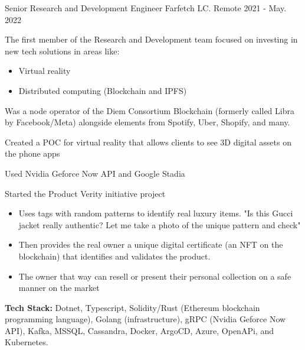\begin{cventries}
\cventry
  {Senior Research and Development Engineer} %
  {Farfetch LC.} %
  {Remote} %
  {2021 - May. 2022} %
  {
    \begin{cvitems} %
      \item {The first member of the Research and Development team focused on investing in new tech solutions in areas like:}
      \begin{itemize}
       \item Virtual reality
       \item Distributed computing (Blockchain and IPFS)
      \end{itemize}
      \item {Was a node operator of the Diem Consortium Blockchain (formerly called Libra by Facebook/Meta) alongside elements from Spotify, Uber, Shopify, and many.}
      \item {Created a POC for virtual reality that allows clients to see 3D digital assets on the phone apps}
      \item {Used Nvidia Geforce Now API and Google Stadia}
      \item {Started the Product Verity initiative project}
      \begin{itemize}
       \item Uses tags with random patterns to identify real luxury items. "Is this Gucci jacket really authentic? Let me take a photo of the unique pattern and check"
       \item Then provides the real owner a unique digital certificate (an NFT on the blockchain) that identifies and validates the product.
       \item The owner that way can resell or present their personal collection on a safe manner on the market
      \end{itemize}
      \item {\textbf{Tech Stack:} Dotnet, Typescript, Solidity/Rust (Ethereum blockchain programming language), Golang (infrastructure), gRPC (Nvidia Geforce Now API), Kafka, MSSQL, Cassandra, Docker, ArgoCD, Azure, OpenAPi, and Kubernetes.}
    \end{cvitems}
  }


\end{cventries}
